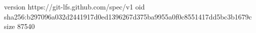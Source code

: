 version https://git-lfs.github.com/spec/v1
oid sha256:b297096a032d2441917d0ed1396267d375ba9955a0f0c8551417dd5bc3b1679c
size 87540
